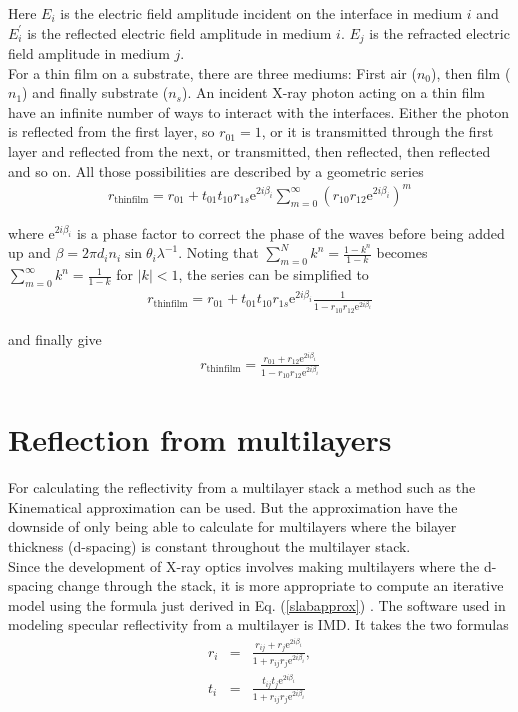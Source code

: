 Here $E_i$ is the electric field amplitude incident on the interface in medium $i$ and $E_i^{'}$ is the reflected electric field amplitude in medium $i$. $E_j$ is the refracted electric field amplitude in medium $j$.\\

For a thin film on a substrate, there are three mediums: First air ($n_0$), then film ($n_1$) and finally substrate ($n_s$). An incident X-ray photon acting on a thin film have an infinite number of ways to interact with the interfaces. Either the photon is reflected from the first layer, so $r_{01} = 1$, or it is transmitted through the first layer and reflected from the next, or transmitted, then reflected, then reflected and so on. All those possibilities are described by a geometric series
\begin{eqnarray}
	r_{\mathrm{thin film}} = r_{01} + t_{01}t_{10}r_{1s}\mathrm{e}^{2 i \beta_i}\sum_{m=0}^{\infty}(r_{10}r_{12}\mathrm{e}^{2 i \beta_i})^m
\end{eqnarray}

where $\mathrm{e}^{2i\beta_i}$ is a phase factor to correct the phase of the waves before being added up and $\beta = 2 \pi d_i n_i \sin{\theta_i}\lambda^{-1}$. Noting that $\sum_{m=0}^{N}k^n = \frac{1 - k^n}{1-k}$ becomes $\sum_{m=0}^{\infty}k^n = \frac{1}{1-k}$ for $|k| < 1$, the series can be simplified to
\begin{eqnarray}
	r_{\mathrm{thin film}} = r_{01} + t_{01}t_{10}r_{1s}\mathrm{e}^{2i\beta_i}\frac{1}{1-r_{10}r_{12}\mathrm{e}^{2i\beta_i}}
\end{eqnarray}

and finally give
\begin{eqnarray}
	r_{\mathrm{thin film}} = \frac{r_{01} + r_{12}\mathrm{e}^{2i\beta_i}}{1-r_{10}r_{12}\mathrm{e}^{2i\beta_i}} \label{slabapprox}
\end{eqnarray}

\section{Reflection from multilayers}
For calculating the reflectivity from a multilayer stack a method such as the Kinematical approximation can be used. But the approximation have the downside of only being able to calculate for multilayers where the bilayer thickness (d-spacing) is constant throughout the multilayer stack. \\
Since the development of X-ray optics involves making multilayers where the d-spacing change through the stack, it is more appropriate to compute an iterative model using the formula just derived in Eq. (\ref{slabapprox}) . The software used in modeling specular reflectivity from a multilayer is IMD\cite{Windt:1998tb}. It takes the two formulas
\begin{eqnarray}\label{fresnelcoef}
	r_i &=& \frac{r_{ij}+r_j\mathrm{e}^{2 i \beta_i}}{1+r_{ij}r_j\mathrm{e}^{2 i \beta_i}},\\
	t_i &=& \frac{t_{ij}t_j\mathrm{e}^{2 i \beta_i}}{1+r_{ij}r_j\mathrm{e}^{2 i \beta_i}}\\
\end{eqnarray}

